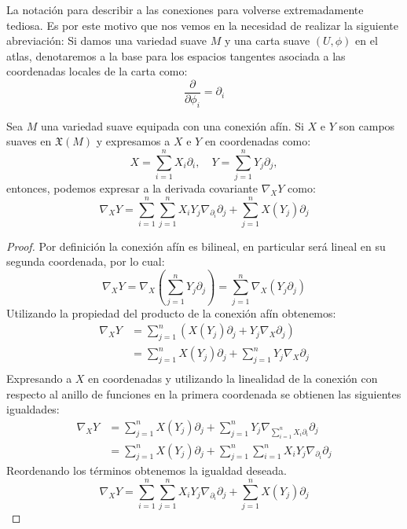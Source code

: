 La notación para describir a las conexiones para volverse extremadamente tediosa. Es por este motivo que nos vemos en la necesidad de realizar la siguiente abreviación: Si damos una variedad suave $M$ y una carta suave $(U,\phi)$ en el atlas, denotaremos a la base para los espacios tangentes asociada a las coordenadas locales de la carta como:
\[
	\frac{\partial}{\partial \phi_{i}} = \partial_{i}
\]

\begin{lemma}\label{Lema - Conexión Afín en Coordenadas}
	Sea $M$ una variedad suave equipada con una conexión afín. Si $X$ e $Y$ son campos suaves en $\mathfrak{X}(M)$ y expresamos a $X$ e $Y$ en coordenadas como:
	\[
		X = \sum_{i=1}^{n} X_{i}\partial_{i}, \quad
		Y = \sum_{j=1}^{n} Y_{j}\partial_{j},
	\]
	entonces, podemos expresar a la derivada covariante $\nabla_{X}Y$ como:
	\[
		\nabla_{X}Y = \sum_{i=1}^{n}\sum_{j=1}^{n} X_{i}Y_{j}\nabla_{\partial_{i}}\partial_{j}
		+ \sum_{j=1}^{n} X(Y_{j})\partial_{j}
	\]
\end{lemma}

\begin{proof}
	Por definición la conexión afín es bilineal, en particular será lineal en su segunda coordenada, por lo cual:
	\[
		\nabla_{X}Y = \nabla_{X} \left( \sum_{j=1}^{n} Y_{j} \partial_{j}\right)
		= \sum_{j=1}^{n} \nabla_{X} (Y_{j} \partial_{j})
	\]
	Utilizando la propiedad del producto de la conexión afín obtenemos:
	\begin{align*}
		\nabla_{X}Y & = \sum_{j=1}^{n} (X(Y_{j}) \partial_{j} + Y_{j} \nabla_{X}\partial_{j})              \\
		            & = \sum_{j=1}^{n} X(Y_{j}) \partial_{j} + \sum_{j=1}^{n} Y_{j} \nabla_{X}\partial_{j} \\
	\end{align*}
	Expresando a $X$ en coordenadas y utilizando la linealidad de la conexión con respecto al anillo de funciones en la primera coordenada se obtienen las siguientes igualdades:
	\begin{align*}
		\nabla_{X}Y
		 & = \sum_{j=1}^{n} X(Y_{j})\partial_{j} + \sum_{j=1}^{n} Y_{j} \nabla_{\sum_{i=1}^{n} X_{i}\partial_{i}}\partial_{j} \\
		 & = \sum_{j=1}^{n}X(Y_{j})\partial_{j} + \sum_{j=1}^{n}\sum_{i=1}^{n} X_{i}Y_{j} \nabla_{\partial_{i}}\partial_{j}
	\end{align*}
	Reordenando los términos obtenemos la igualdad deseada.
	\[
		\nabla_{X}Y = \sum_{i=1}^{n}\sum_{j=1}^{n} X_{i}Y_{j}\nabla_{\partial_{i}}\partial_{j}
		+ \sum_{j=1}^{n} X(Y_{j})\partial_{j}
	\]
\end{proof}

